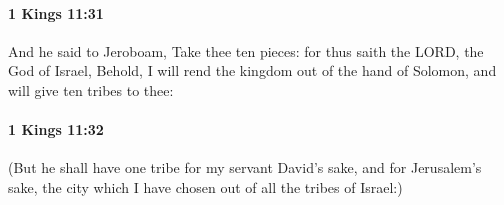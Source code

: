		\paragraph{1 Kings 11:31} %
			\label{1KINGS-11-31}

			And he said to Jeroboam, Take thee ten pieces: for thus saith the LORD, the God of Israel, Behold, I will rend the kingdom out of the hand of Solomon, and will give ten tribes to thee:


		\paragraph{1 Kings 11:32} %
			\label{1KINGS-11-32}

			(But he shall have one tribe for my servant David’s sake, and for Jerusalem’s sake, the city which I have chosen out of all the tribes of Israel:)


